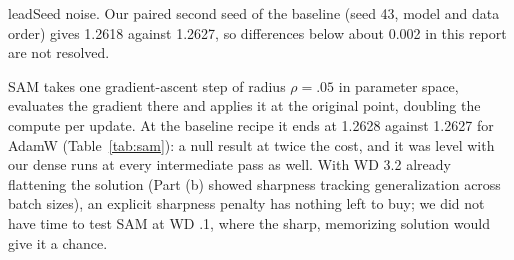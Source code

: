lead{Seed noise.} Our paired second seed of the baseline (seed 43, model and data order) gives 1.2618 against 1.2627, so differences below about 0.002 in this report are not resolved.

SAM takes one gradient-ascent step of radius $\rho=.05$ in parameter space, evaluates the gradient there and applies it at the original point, doubling the compute per update. At the baseline recipe it ends at 1.2628 against 1.2627 for AdamW (Table~\ref{tab:sam}): a null result at twice the cost, and it was level with our dense runs at every intermediate pass as well. With WD 3.2 already flattening the solution (Part (b) showed sharpness tracking generalization across batch sizes), an explicit sharpness penalty has nothing left to buy; we did not have time to test SAM at WD .1, where the sharp, memorizing solution would give it a chance.
